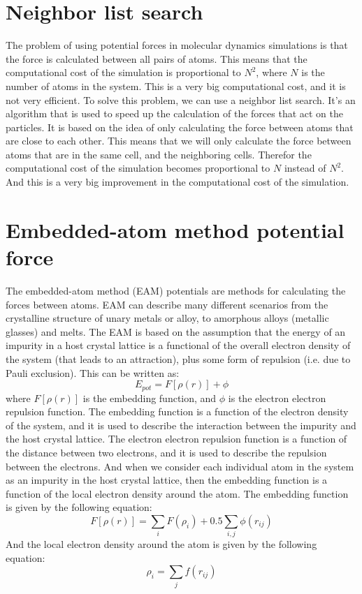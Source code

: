 \section{Neighbor list search}
    The problem of using potential forces in molecular dynamics simulations is that the force is calculated between all pairs of atoms. This means that the computational cost of the simulation is proportional to $N^2$, where $N$ is the number of atoms in the system. This is a very big computational cost, and it is not very efficient. 
    To solve this problem, we can use a neighbor list search. It's an algorithm that is used to speed up the calculation of the forces that act on the particles. 
    It is based on the idea of only calculating the force between atoms that are close to each other. This means that we will only calculate the force between atoms that are in the same cell, and the neighboring cells. Therefor the computational cost of the simulation becomes proportional to $N$ instead of $N^2$. And this is a very big improvement in the computational cost of the simulation. 
    
    

\section{Embedded-atom method potential force}
    The embedded-atom method (EAM) potentials are  methods for calculating the forces between atoms. EAM can describe many different scenarios from the crystalline structure of unary metals or alloy, to amorphous alloys (metallic glasses) and melts. The EAM is based on the assumption that the energy of an impurity in a host crystal lattice is a functional of the overall electron density of the system (that leads to an attraction), plus some form of repulsion (i.e. due to Pauli exclusion). This can be written as:
    \begin{equation}
        E_{pot} = F[\rho(r)] + \phi
    \end{equation}
    where $F[\rho(r)]$ is the embedding function, and $\phi$ is the electron electron repulsion function. The embedding function is a function of the electron density of the system, and it is used to describe the interaction between the impurity and the host crystal lattice.
    The electron electron repulsion function is a function of the distance between two electrons, and it is used to describe the repulsion between the electrons. And when we consider each individual atom in the system as an impurity in the host crystal lattice, then the embedding function is a function of the local electron density around the atom. The embedding function is given by the following equation:
    \begin{equation}
        F[\rho(r)] = \sum_{i} F(\rho_i) + 0.5\sum_{i,j} \phi(r_{ij})
    \end{equation}
    And the local electron density around the atom is given by the following equation:
    \begin{equation}
        \rho_i = \sum_{j} f(r_{ij})
    \end{equation}

